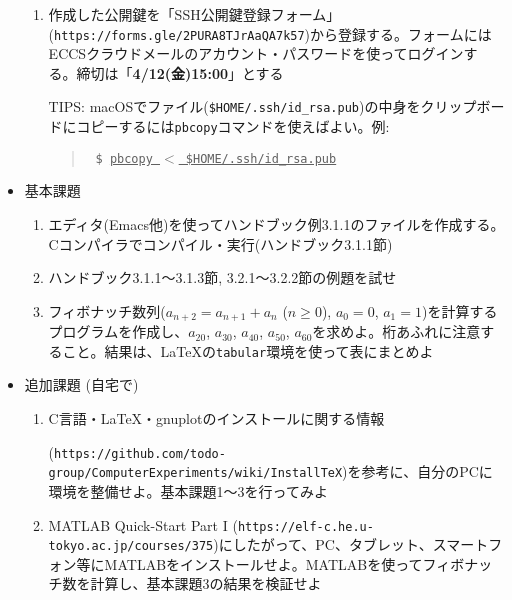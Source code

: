 \documentclass[11pt]{jarticle}
\begin{document}
\begin{itemize}
\begin{enumerate}
  \item 作成した公開鍵を「SSH公開鍵登録フォーム」(\verb+https://forms.gle/2PURA8TJrAaQA7k57+)から登録する。フォームにはECCSクラウドメールのアカウント・パスワードを使ってログインする。締切は「{\bf 4/12(金)15:00}」とする

    TIPS: macOSでファイル({\tt \$HOME/.ssh/id\_rsa.pub})の中身をクリップボードにコピーするには{\tt pbcopy}コマンドを使えばよい。例:
    \begin{quote} \tt
      \$ \underline{pbcopy $<$ \$HOME/.ssh/id\_rsa.pub}
    \end{quote}
  \end{enumerate}
\item 基本課題
  \begin{enumerate}
  \item エディタ(Emacs他)を使ってハンドブック例3.1.1のファイルを作成する。Cコンパイラでコンパイル・実行(ハンドブック3.1.1節)
  \item ハンドブック3.1.1〜3.1.3節, 3.2.1〜3.2.2節の例題を試せ
  \item フィボナッチ数列($a_{n+2}=a_{n+1}+a_n$ ($n \ge 0$), $a_0=0$, $a_1=1$)を計算するプログラムを作成し、$a_{20}$, $a_{30}$, $a_{40}$, $a_{50}$, $a_{60}$を求めよ。桁あふれに注意すること。結果は、\LaTeX の{\tt tabular}環境を使って表にまとめよ
  \end{enumerate}
\item 追加課題 (自宅で)
  \begin{enumerate}
  \item C言語・\LaTeX・gnuplotのインストールに関する情報

    (\verb+https://github.com/todo-group/ComputerExperiments/wiki/InstallTeX+)を参考に、自分のPCに環境を整備せよ。基本課題1〜3を行ってみよ
  \item MATLAB Quick-Start Part I (\verb+https://elf-c.he.u-tokyo.ac.jp/courses/375+)にしたがって、PC、タブレット、スマートフォン等にMATLABをインストールせよ。MATLABを使ってフィボナッチ数を計算し、基本課題3の結果を検証せよ
  \end{enumerate}
\end{itemize}
\end{document}
